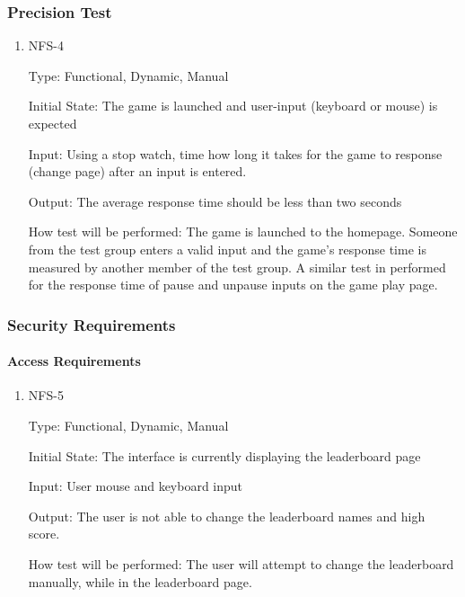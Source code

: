 \documentclass[12pt, titlepage]{article}
\begin{document}
	\subsubsection{Precision Test}
	\begin{enumerate}
		\item{NFS-4\\}
		
		Type: Functional, Dynamic, Manual
		
		Initial State: The game is launched and user-input (keyboard or mouse) is expected
		
		Input: Using a stop watch, time how long it takes for the game to response (change page) after an input is entered.
		
		Output: The average response time should be less than two seconds
		
		How test will be performed: The game is launched to the homepage. Someone from the test group enters a valid input and the game's response time is measured by another member of the test group. A similar test in performed for the response time of pause and unpause inputs on the game play page.
		
	\end{enumerate}
	
	\subsubsection{Security Requirements}
	
	\paragraph{Access Requirements}
	\begin{enumerate}
		\item{NFS-5\\}
		
		Type: Functional, Dynamic, Manual
		
		Initial State: The interface is currently displaying the leaderboard page
		
		Input: User mouse and keyboard input
		
		Output: The user is not able to change the leaderboard names and high score.
		
		How test will be performed: The user will attempt to change the leaderboard manually, while in the leaderboard page.
		
	\end{enumerate}
	
\end{document}
